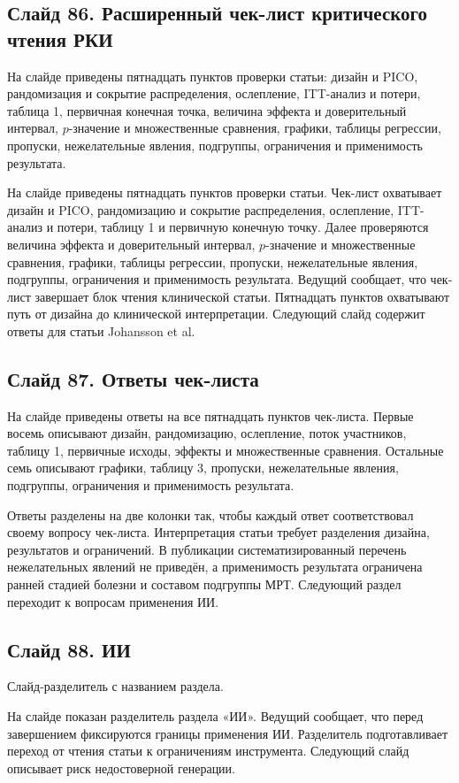 \documentclass[11pt,a4paper]{article}
\begin{document}
\subsection*{Слайд 86. Расширенный чек-лист критического чтения РКИ}
\begin{onslide}
На слайде приведены пятнадцать пунктов проверки статьи: дизайн и PICO, рандомизация и сокрытие распределения, ослепление, ITT-анализ и потери, таблица 1, первичная конечная точка, величина эффекта и доверительный интервал, $p$-значение и множественные сравнения, графики, таблицы регрессии, пропуски, нежелательные явления, подгруппы, ограничения и применимость результата.
\end{onslide}
На слайде приведены пятнадцать пунктов проверки статьи. Чек-лист охватывает дизайн и PICO, рандомизацию и сокрытие распределения, ослепление, ITT-анализ и потери, таблицу 1 и первичную конечную точку. Далее проверяются величина эффекта и доверительный интервал, $p$-значение и множественные сравнения, графики, таблицы регрессии, пропуски, нежелательные явления, подгруппы, ограничения и применимость результата. Ведущий сообщает, что чек-лист завершает блок чтения клинической статьи. Пятнадцать пунктов охватывают путь от дизайна до клинической интерпретации. Следующий слайд содержит ответы для статьи Johansson et al.

\subsection*{Слайд 87. Ответы чек-листа}
\begin{onslide}
На слайде приведены ответы на все пятнадцать пунктов чек-листа. Первые восемь описывают дизайн, рандомизацию, ослепление, поток участников, таблицу 1, первичные исходы, эффекты и множественные сравнения. Остальные семь описывают графики, таблицу 3, пропуски, нежелательные явления, подгруппы, ограничения и применимость результата.
\end{onslide}
Ответы разделены на две колонки так, чтобы каждый ответ соответствовал своему вопросу чек-листа. Интерпретация статьи требует разделения дизайна, результатов и ограничений. В публикации систематизированный перечень нежелательных явлений не приведён, а применимость результата ограничена ранней стадией болезни и составом подгруппы МРТ. Следующий раздел переходит к вопросам применения ИИ.

\subsection*{Слайд 88. ИИ}
\begin{onslide}
Слайд-разделитель с названием раздела.
\end{onslide}
На слайде показан разделитель раздела «ИИ». Ведущий сообщает, что перед завершением фиксируются границы применения ИИ. Разделитель подготавливает переход от чтения статьи к ограничениям инструмента. Следующий слайд описывает риск недостоверной генерации.
\end{document}

